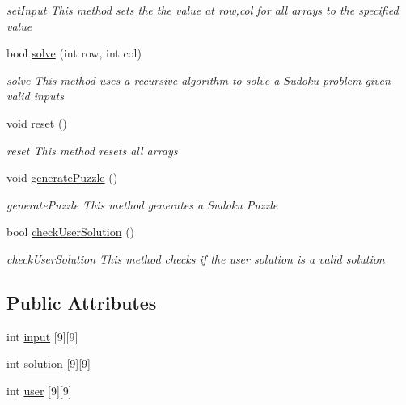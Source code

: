 \begin{DoxyCompactItemize}
\begin{DoxyCompactList}\small\item\em set\+Input This method sets the the value at row,col for all arrays to the specified value \end{DoxyCompactList}\item 
bool \hyperlink{class_sudoku_solver_a9e2c13564d2bf647733c49cc89963553}{solve} (int row, int col)
\begin{DoxyCompactList}\small\item\em solve This method uses a recursive algorithm to solve a Sudoku problem given valid inputs \end{DoxyCompactList}\item 
void \hyperlink{class_sudoku_solver_aa86631e9684d9e5b3d77865f06323311}{reset} ()
\begin{DoxyCompactList}\small\item\em reset This method resets all arrays \end{DoxyCompactList}\item 
void \hyperlink{class_sudoku_solver_a84ba9bd3646b7357543f4499cdf4ba0f}{generate\+Puzzle} ()
\begin{DoxyCompactList}\small\item\em generate\+Puzzle This method generates a Sudoku Puzzle \end{DoxyCompactList}\item 
bool \hyperlink{class_sudoku_solver_a95305521706322fdd6d50340c6da2216}{check\+User\+Solution} ()
\begin{DoxyCompactList}\small\item\em check\+User\+Solution This method checks if the user solution is a valid solution \end{DoxyCompactList}\end{DoxyCompactItemize}
\subsection*{Public Attributes}
\begin{DoxyCompactItemize}
\item 
int \hyperlink{class_sudoku_solver_a5623374dbdea1eb6aaa857521e8ff6c2}{input} \mbox{[}9\mbox{]}\mbox{[}9\mbox{]}
\item 
int \hyperlink{class_sudoku_solver_a1aca7fe43c36b2eb07a1357f76c728d4}{solution} \mbox{[}9\mbox{]}\mbox{[}9\mbox{]}
\item 
int \hyperlink{class_sudoku_solver_a6e2f7ae7438f42979bcbd9cee385b24c}{user} \mbox{[}9\mbox{]}\mbox{[}9\mbox{]}
\end{DoxyCompactItemize}



